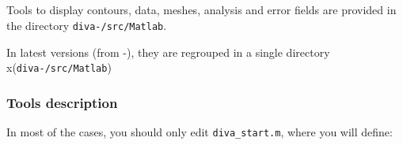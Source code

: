 \subsection{\matlab}

Tools to display contours, data, meshes, analysis and error fields are provided in the directory \texttt{diva-\divaversion/src/Matlab}. 


In latest versions (from \diva-\divaversion), they are regrouped in a single directory\\
x(\texttt{diva-\divaversion/src/Matlab})



\subsubsection{Tools description}

In most of the cases, you should only edit \texttt{diva\_start.m}, where you will define:

